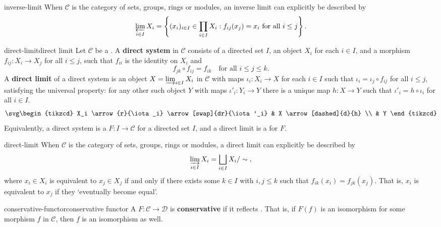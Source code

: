 \begin{example}{inverse-limit}
    When $\mathcal{C}$ is the category of sets, groups, rings or modules, an inverse limit can explicitly be described by
    \[ \varprojlim_{i \in I} X_i = \left\{ (x_i)_{i \in I} \in \prod_{i \in I} X_i : f_{ij}(x_j) = x_i \text{ for all } i \le j \right\} . \]
\end{example}

\begin{topic}{direct-limit}{direct limit}
    Let $\mathcal{C}$ be a . A \textbf{direct system} in $\mathcal{C}$ consists of a directed set $I$, an object $X_i$ for each $i \in I$, and a morphism $f_{ij} : X_i \to X_j$ for all $i \le j$, such that $f_{ii}$ is the identity on $X_i$ and
    \[ f_{jk} \circ f_{ij} = f_{ik} \quad \text{for all } i \le j \le k . \]
    A \textbf{direct limit} of a direct system is an object $X = \varinjlim_{i \in I} X_i$ in $\mathcal{C}$ with maps $\iota_i : X_i \to X$ for each $i \in I$ such that $\iota_i = \iota_j \circ f_{ij}$ for all $i \le j$, satisfying the universal property: for any other such object $Y$ with maps $\iota'_i : Y_i \to Y$ there is a unique map $h : X \to Y$ such that $\iota'_i = h \circ \iota_i$ for all $i \in I$.
    \[ \svg \begin{tikzcd} X_i \arrow{r}{\iota_i} \arrow[swap]{dr}{\iota'_i} & X \arrow[dashed]{d}{h} \\ & Y \end{tikzcd} \]
    Equivalently, a direct system is a  $F : I \to \mathcal{C}$ for a directed set $I$, and a direct limit is a  for $F$.
\end{topic}

\begin{example}{direct-limit}
    When $\mathcal{C}$ is the category of sets, groups, rings or modules, a direct limit can     explicitly be described by
    \[ \varinjlim_{i \in I} X_i = \bigsqcup_{i \in I} X_i / \sim{} , \]
    where $x_i \in X_i$ is equivalent to $x_j \in X_j$ if and only if there exists some $k \in I$ with $i, j \le k$ such that $f_{ik}(x_i) = f_{jk}(x_j)$. That is, $x_i$ is equivalent to $x_j$ if they `eventually become equal'.
\end{example}

\begin{topic}{conservative-functor}{conservative functor}
    A  $F : \mathcal{C} \to \mathcal{D}$ is \textbf{conservative} if it reflects . That is, if $F(f)$ is an isomorphism for some morphism $f$ in $\mathcal{C}$, then $f$ is an isomorphism as well.
\end{topic}

